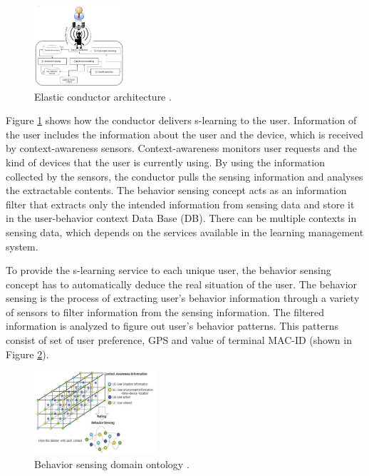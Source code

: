\documentclass[journal]{vgtc}
\begin{document}
  \begin{figure}[t]
    \centering
    \includegraphics[width=0.3\textwidth]{elastic-conductor}
    \caption{Elastic conductor architecture \cite{Kim2013}.}
    \label{elastic-conductor}
  \end{figure}

  Figure \ref{elastic-conductor} shows how the conductor delivers s-learning to the user. Information of the user includes the information about the user and the device, which is received by context-awareness sensors. Context-awareness monitors user requests and the kind of devices that the user is currently using. By using the information collected by the sensors, the conductor pulls the sensing information and analyses the extractable contents. The behavior sensing concept acts as an information filter that extracts only the intended information from sensing data and store it in the user-behavior context Data Base (DB). There can be multiple contexts in sensing data, which depends on the services available in the learning management system.

  To provide the s-learning service to each unique user, the behavior sensing concept has to automatically deduce the real situation of the user. The behavior sensing is the process of extracting user's behavior information through a variety of sensors to filter information from the sensing information. The filtered information is analyzed to figure out user's behavior patterns. This patterns consist of set of user preference, GPS and value of terminal MAC-ID (shown in Figure \ref{behaviour-sensing}).

  \begin{figure}[t]
    \centering
    \includegraphics[width=0.4\textwidth]{behaviour-sensing}
    \caption{Behavior sensing domain ontology \cite{Kim2013}.}
    \label{behaviour-sensing}
  \end{figure}
\end{document}
